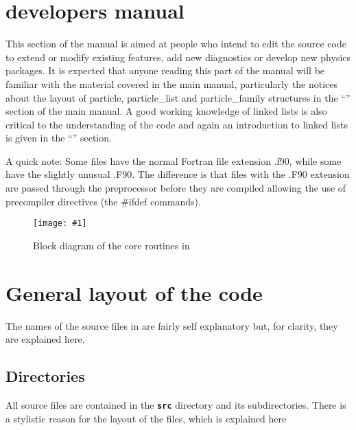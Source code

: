 \documentclass[12pt,a4paper]{article}
\newcommand{\inlinecode}[1]{{\color{warwickred} \bf\texttt{#1}}}
\newcommand{\EPOCH}{{\color{warwickdark}\fontfamily{phv}\selectfont{EPOCH}}}
\newcommand{\scaledcapimage}[4]
  {{\begin{figure}[hbt!]\centering\texttt{[image: \#1]}\caption{#3}
    \label{#2} \end{figure}}}
\begin{document}
{
  \selectfont
}

\section{{\EPOCH} developers manual}

This section of the manual is aimed at people who intend to edit the {\EPOCH}
source code to extend or modify existing features, add new diagnostics or
develop new physics packages. It is expected that anyone reading this part of
the manual will be familiar with the material covered in the main manual,
particularly the notices about the layout of particle, particle\_list and
particle\_family structures in the ``'' section
of the main manual. A good working knowledge of linked lists is also critical to
the understanding of the code and again an introduction to linked lists is
given in the ``'' section.

A quick note: Some files have the normal Fortran file extension .f90, while
some have the slightly unusual .F90. The difference is that files with the
.F90 extension are passed through the preprocessor before they are compiled
allowing the use of precompiler directives (the \#ifdef commands).

\scaledcapimage{./images/coreblock2}{coreblock}{Block diagram of the core
  routines in {\EPOCH}}{0.5}

\section{General layout of the {\EPOCH} code}

The names of the source files in {\EPOCH} are fairly self explanatory but, for
clarity, they are explained here.

\subsection{Directories}
All source files are contained in the \inlinecode{src} directory and its
subdirectories. There is a stylistic reason for the layout of the files, which
is explained here
\end{document}
